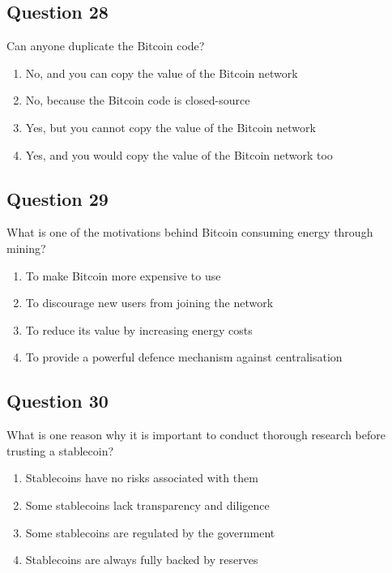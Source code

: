 \documentclass[12pt,a4paper]{article}
\begin{document}
\bigskip


\subsection*{Question 28}
Can anyone duplicate the Bitcoin code?

\begin{enumerate}[label=\Alph*., leftmargin=*]
\item No, and you can copy the value of the Bitcoin network
\item No, because the Bitcoin code is closed-source
\item Yes, but you cannot copy the value of the Bitcoin network
\item Yes, and you would copy the value of the Bitcoin network too
\end{enumerate}

\bigskip


\subsection*{Question 29}
What is one of the motivations behind Bitcoin consuming energy through mining?

\begin{enumerate}[label=\Alph*., leftmargin=*]
\item To make Bitcoin more expensive to use
\item To discourage new users from joining the network
\item To reduce its value by increasing energy costs
\item To provide a powerful defence mechanism against centralisation
\end{enumerate}

\bigskip


\subsection*{Question 30}
What is one reason why it is important to conduct thorough research before trusting a stablecoin?

\begin{enumerate}[label=\Alph*., leftmargin=*]
\item Stablecoins have no risks associated with them
\item Some stablecoins lack transparency and diligence
\item Some stablecoins are regulated by the government
\item Stablecoins are always fully backed by reserves
\end{enumerate}
\end{document}
